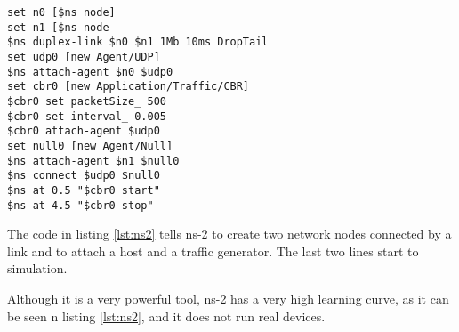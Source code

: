\lstset{language=zsh, caption=NS-2 topology, label=lst:ns2}
\begin{lstlisting}
set n0 [$ns node]
set n1 [$ns node
$ns duplex-link $n0 $n1 1Mb 10ms DropTail
set udp0 [new Agent/UDP]
$ns attach-agent $n0 $udp0
set cbr0 [new Application/Traffic/CBR]
$cbr0 set packetSize_ 500
$cbr0 set interval_ 0.005
$cbr0 attach-agent $udp0
set null0 [new Agent/Null] 
$ns attach-agent $n1 $null0
$ns connect $udp0 $null0
$ns at 0.5 "$cbr0 start"
$ns at 4.5 "$cbr0 stop"
\end{lstlisting}

The code in listing \ref{lst:ns2} tells ns-2 to create two network nodes connected by a link
and to attach a host and a traffic generator. The last two lines start to simulation.

Although it is a very powerful tool, ns-2 has a very high learning curve, as it can be seen
n listing \ref{lst:ns2}, and it does not run real devices.
